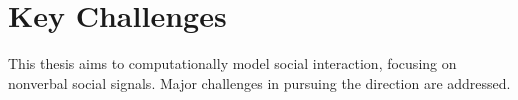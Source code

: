 \section{Key Challenges}
This thesis aims to computationally model social interaction, focusing on nonverbal social signals. Major challenges in pursuing the direction are addressed.
